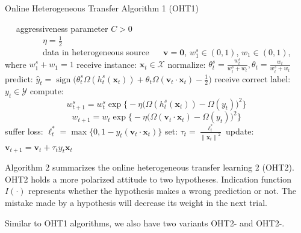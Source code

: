 \documentclass{article} %
\theoremstyle{remark}
\theoremstyle{definition}
\DeclareMathOperator{\sign}{sign}
\begin{document}
\begin{algorithm}
\begin{algorithmic}[1]
\caption{Online Heterogeneous Transfer Algorithm 1 (OHT1)}
\REQUIRE ~~
aggressiveness parameter $C>0$\\ 
~~~~~~~~~$\eta = \frac{1}{2}$ \\
~~~~~~~~~data in heterogeneous source 
\ENSURE ~~
$\mathbf{v} = \mathbf{0}$, $w_{1}^{s} \in (0,1)$, $w_{1} \in (0,1)$, where $w_{1}^{s} + w_1 = 1$
\STATE 
  receive instance: $\mathbf{x}_t \in \mathcal{X}$
\STATE
  normalize: $\theta_{t}^{s} = \frac{w_{t}^{s}}{w_{t}^{s}+w_t}, \theta_{t} = \frac{w_{t}}{w_{t}^{s}+w_t}$
\STATE
  predict: $\hat{y}_t = \sign \big( \theta_{t}^{s} \varOmega (h_{t}^{s}(\mathbf{x}_t)) + \theta_{t} \varOmega (\mathbf{v}_t \cdot \mathbf{x}_t) - \frac{1}{2} \big)$
\STATE
  receive correct label: $y_t \in \mathcal{Y}$
\STATE
  compute: 
    $$w_{t+1}^{s} = w_{t}^{s} \exp \big\{ -\eta \big(\varOmega(h_{t}^{s}(\mathbf{x}_t)) - \varOmega(y_t)\big)^2 \big\} $$
    $$w_{t+1} = w_{t} \exp \big\{ -\eta \big(\varOmega(\mathbf{v}_t \cdot \mathbf{x}_t) - \varOmega(y_t)\big)^2 \big\} $$
\STATE
  suffer loss: $\ell_{t}^{*} = \max \{0, 1-y_t(\mathbf{v}_t \cdot \mathbf{x}_t)\}$
\STATE
  set: $\tau_t = \frac{\ell_{t}^{*}}{{\|\mathbf{x}_t\|}^2}$
\STATE
  update: $ \mathbf{v}_{t+1} = \mathbf{v}_t + \tau_t y_t \mathbf{x}_t $
\ENDFOR
\end{algorithmic}
\end{algorithm}

Algorithm 2 summarizes the online heterogeneous transfer learning 2 (OHT2).
OHT2 holds a more polarized attitude to two hypotheses.
Indication function $I(\cdot)$ represents whether the hypothesis makes a wrong prediction or not.
The mistake made by a hypothesis will decrease its weight in the next trial.

Similar to OHT1 algorithms, we also have two variants OHT2-\uppercase\expandafter{} and OHT2-\uppercase\expandafter{}.
\end{document}
